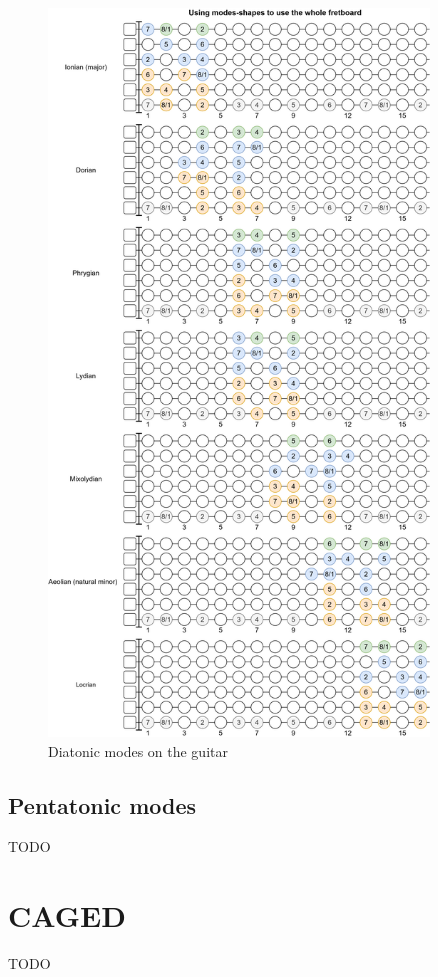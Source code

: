 \begin{figure}[h]
	\centering
	\includegraphics[width=0.9\textwidth]{../../Images/guitar_mode_all.png}
	\caption{Diatonic modes on the guitar}
	\label{fig:guitar_diatonic_modes_on_guitar}
\end{figure}

\clearpage

\subsection{Pentatonic modes}
TODO

\section{CAGED}
TODO